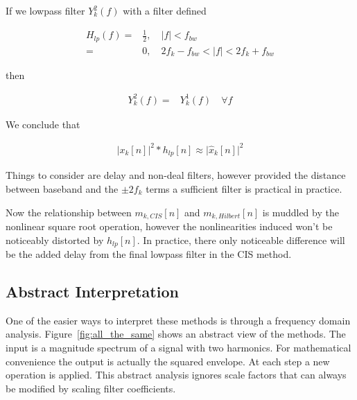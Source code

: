 \documentclass [11pt, proquest] {uwthesis}[2015/03/03]
\begin{document}
If we lowpass filter $Y_k^2(f)$ with a filter defined

\begin{align}
H_{lp}(f) =& \frac{1}{2}, \quad |f| < f_{bw} \\
=& 0, \quad 2f_k - f_{bw} < |f| < 2f_k + f_{bw}
\end{align}

then

\begin{align}
Y_{k}^2(f) =& Y_k^1(f) \quad \forall f
\end{align}

We conclude that 

\begin{align}
\label{eq:squared_cis_hilbert}
\Big| x_k[n] \Big|^2 * h_{lp}[n] \approx \Big| \widehat{x}_k[n] \Big|^2
\end{align}

Things to consider are delay and non-deal filters, however provided the distance between baseband and the $\pm2f_k$ terms a sufficient filter is practical in practice.

Now the relationship between $m_{k,CIS}[n]$ and $m_{k,Hilbert}[n]$ is muddled by the nonlinear square root operation, however the nonlinearities induced won't be noticeably distorted by $h_{lp}[n]$.  In practice, there only noticeable difference will be the added delay from the final lowpass filter in the CIS method.

\subsection{Abstract Interpretation}

One of the easier ways to interpret these methods is through a frequency domain analysis.  Figure~\ref{fig:all_the_same} shows an abstract view of the methods.  The input is a magnitude spectrum of a signal with two harmonics. For mathematical convenience the output is actually the squared envelope.  At each step a new operation is applied.  This abstract analysis ignores scale factors that can always be modified by scaling filter coefficients.
\end{document}
